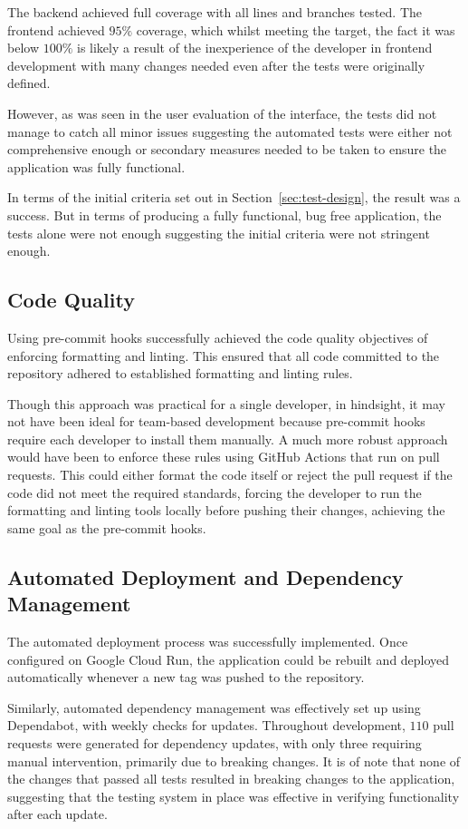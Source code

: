 The backend achieved full coverage with all lines and branches tested. The frontend achieved $95\%$ coverage, which whilst meeting the target, the fact it was below $100\%$ is likely a result of the inexperience of the developer in frontend development with many changes needed even after the tests were originally defined.

However, as was seen in the user evaluation of the interface, the tests did not manage to catch all minor issues suggesting the automated tests were either not comprehensive enough or secondary measures needed to be taken to ensure the application was fully functional.

In terms of the initial criteria set out in Section~\ref{sec:test-design}, the result was a success. But in terms of producing a fully functional, bug free application, the tests alone were not enough suggesting the initial criteria were not stringent enough.

\ifshowappendix
\fi

\subsection{Code Quality}
Using pre-commit hooks successfully achieved the code quality objectives of enforcing formatting and linting. This ensured that all code committed to the repository adhered to established formatting and linting rules.

Though this approach was practical for a single developer, in hindsight, it may not have been ideal for team-based development because pre-commit hooks require each developer to install them manually. A much more robust approach would have been to enforce these rules using GitHub Actions that run on pull requests. This could either format the code itself or reject the pull request if the code did not meet the required standards, forcing the developer to run the formatting and linting tools locally before pushing their changes, achieving the same goal as the pre-commit hooks.

\subsection{Automated Deployment and Dependency Management}
The automated deployment process was successfully implemented. Once configured on Google Cloud Run, the application could be rebuilt and deployed automatically whenever a new tag was pushed to the repository.

Similarly, automated dependency management was effectively set up using Dependabot, with weekly checks for updates. Throughout development, $110$ pull requests were generated for dependency updates, with only three requiring manual intervention, primarily due to breaking changes. It is of note that none of the changes that passed all tests resulted in breaking changes to the application, suggesting that the testing system in place was effective in verifying functionality after each update.
